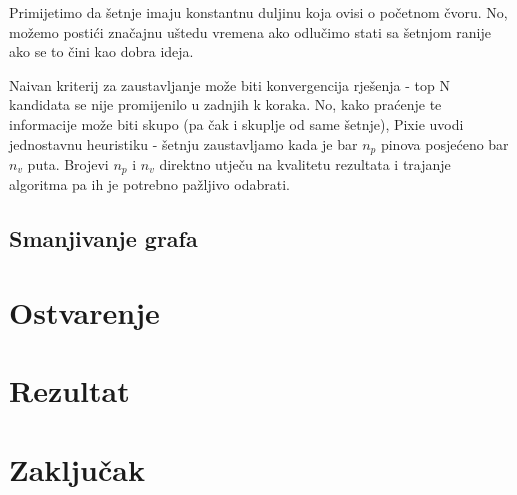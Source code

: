 \documentclass[times, utf8, seminar]{fer}
\begin{document}
Primijetimo da šetnje imaju konstantnu duljinu koja ovisi o početnom čvoru. No, možemo postići značajnu uštedu vremena ako odlučimo stati sa šetnjom ranije ako se to čini kao dobra ideja.

Naivan kriterij za zaustavljanje može biti konvergencija rješenja - top N kandidata se nije promijenilo u zadnjih k koraka. No, kako praćenje te informacije može biti skupo (pa čak i skuplje od same šetnje), Pixie uvodi jednostavnu heuristiku - šetnju zaustavljamo kada je bar $n_p$ pinova posjećeno bar $n_v$ puta. Brojevi $n_p$ i $n_v$ direktno utječu na kvalitetu rezultata i trajanje algoritma pa ih je potrebno pažljivo odabrati.

\section{Smanjivanje grafa}

\chapter{Ostvarenje}

\chapter{Rezultat}

\chapter{Zaključak}



\end{document}
